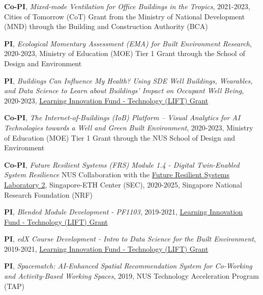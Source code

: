 \documentclass[10pt,a4paper]{article}
\begin{document}
\begin{small}
\begin{etaremune}
  \item \textbf{Co-PI}, \emph{Mixed-mode Ventilation for Office Buildings in the Tropics}, 2021-2023, Cities of Tomorrow (CoT) Grant from the Ministry of National Development (MND) through the Building and Construction Authority (BCA)%

  \item \textbf{PI}, \emph{Ecological Momentary Assessment (EMA) for Built Environment Research}, 2020-2023, Ministry of Education (MOE) Tier 1 Grant through the School of Design and Environment %

  \item \textbf{PI}, \emph{Buildings Can Influence My Health? Using SDE Well Buildings, Wearables, and Data Science to Learn about Buildings’ Impact on Occupant Well Being}, 2020-2023, \href{https://lift.nus.edu.sg/}{Learning Innovation Fund - Technology (LIFT) Grant}%

  \item \textbf{Co-PI}, \emph{The Internet-of-Buildings (IoB) Platform – Visual Analytics for AI Technologies towards a Well and Green Built Environment}, 2020-2023, Ministry of Education (MOE) Tier 1 Grant through the NUS School of Design and Environment%

  \item \textbf{Co-PI}, \emph{Future Resilient Systems (FRS) Module 1.4 - Digital Twin-Enabled System Resilience} NUS Collaboration with the \href{https://sec.ethz.ch/research/frs.html}{Future Resilient Systems Laboratory 2}, Singapore-ETH Center (SEC), 2020-2025, Singapore National Research Foundation (NRF)%

  \item \textbf{PI}, \emph{Blended Module Development - PF1103}, 2019-2021, \href{https://lift.nus.edu.sg/}{Learning Innovation Fund - Technology (LIFT) Grant}%

  \item \textbf{PI}, \emph{edX Course Development - Intro to Data Science for the Built Environment}, 2019-2021, \href{https://lift.nus.edu.sg/}{Learning Innovation Fund - Technology (LIFT) Grant}%

  \item \textbf{PI}, \emph{Spacematch: AI-Enhanced Spatial Recommendation System for Co-Working and Activity-Based Working Spaces}, 2019, NUS Technology Acceleration Program (TAP)%


\end{etaremune}
\end{small}
\end{document}
